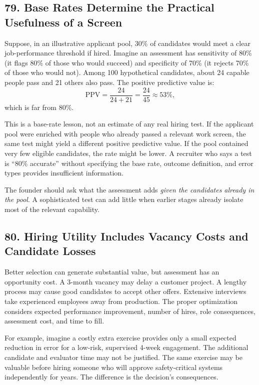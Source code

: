\subsection*{79. Base Rates Determine the Practical Usefulness of a Screen}

Suppose, in an illustrative applicant pool, 30\% of candidates would meet a clear job-performance threshold if hired. Imagine an assessment has sensitivity of 80\% (it flags 80\% of those who would succeed) and specificity of 70\% (it rejects 70\% of those who would not). Among 100 hypothetical candidates, about 24 capable people pass and 21 others also pass. The positive predictive value is:
\begin{equation}
\text{PPV} = \frac{24}{24 + 21} = \frac{24}{45} \approx 53\%,
\end{equation}
which is far from 80\%.

This is a base-rate lesson, not an estimate of any real hiring test. If the applicant pool were enriched with people who already passed a relevant work screen, the same test might yield a different positive predictive value. If the pool contained very few eligible candidates, the rate might be lower. A recruiter who says a test is ``80\% accurate'' without specifying the base rate, outcome definition, and error types provides insufficient information.

The founder should ask what the assessment adds \textit{given the candidates already in the pool}. A sophisticated test can add little when earlier stages already isolate most of the relevant capability.

\subsection*{80. Hiring Utility Includes Vacancy Costs and Candidate Losses}

Better selection can generate substantial value, but assessment has an opportunity cost. A 3-month vacancy may delay a customer project. A lengthy process may cause good candidates to accept other offers. Extensive interviews take experienced employees away from production. The proper optimization considers expected performance improvement, number of hires, role consequences, assessment cost, and time to fill.

For example, imagine a costly extra exercise provides only a small expected reduction in error for a low-risk, supervised 4-week engagement. The additional candidate and evaluator time may not be justified. The same exercise may be valuable before hiring someone who will approve safety-critical systems independently for years. The difference is the decision's consequences.

